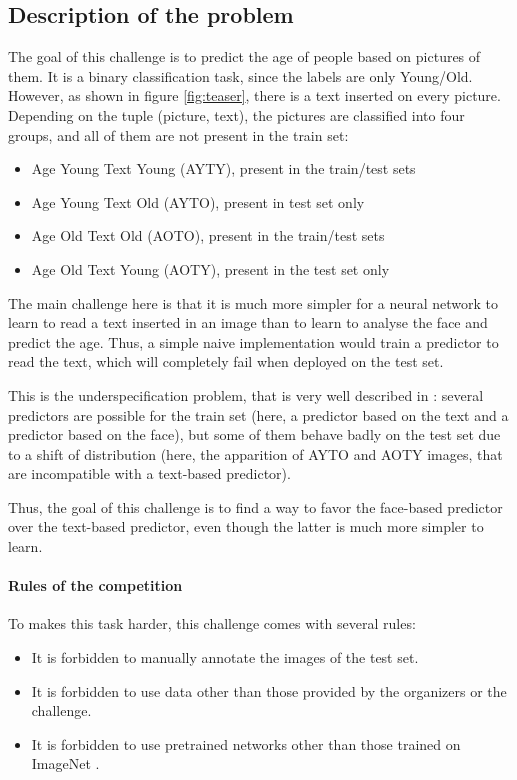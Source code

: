 \documentclass[sigconf, nonacm]{acmart}
\begin{document}
\subsection{Description of the problem}

The goal of this challenge is to predict the age of people based on pictures of them. It is a binary classification task, since the labels are only Young/Old. However, as shown in figure \ref{fig:teaser}, there is a text inserted on every picture. Depending on the tuple (picture, text), the pictures are classified into four groups, and all of them are not present in the train set:

\begin{itemize}
    \item Age Young Text Young (AYTY), present in the train/test sets
    \item Age Young Text Old (AYTO), present in test set only
    \item Age Old Text Old (AOTO), present in the train/test sets
    \item Age Old Text Young (AOTY), present in the test set only
\end{itemize}

The main challenge here is that it is much more simpler for a neural network to learn to read a text inserted in an image than to learn to analyse the face and predict the age. Thus, a simple naive implementation would train a predictor to read the text, which will completely fail when deployed on the test set.

This is the underspecification problem, that is very well described in \cite{damour_underspecification_2020}: several predictors are possible for the train set (here, a predictor based on the text and a predictor based on the face), but some of them behave badly on the test set due to a shift of distribution (here, the apparition of AYTO and AOTY images, that are incompatible with a text-based predictor). 

Thus, the goal of this challenge is to find a way to favor the face-based predictor over the text-based predictor, even though the latter is much more simpler to learn.

\paragraph{Rules of the competition} To makes this task harder, this challenge comes with several rules:

\begin{itemize}
    \item It is forbidden to manually annotate the images of the test set.
    \item It is forbidden to use data other than those provided by the organizers or the challenge. 
    \item It is forbidden to use pretrained networks other than those trained on ImageNet \cite{deng_imagenet_2009}.
\end{itemize}
\end{document}
